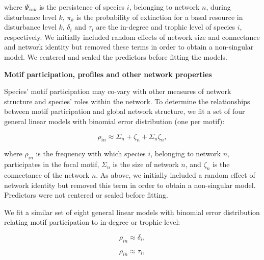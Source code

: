 \documentclass[12pt]{article}
\begin{document}
\begin{spacing}{2.0}
            \noindent where $\Psi_{ink}$ is the persistence of species $i$, belonging to network $n$, during disturbance level $k$, $\pi_k$ is the probability of extinction for a basal resource in disturbance level $k$, 
            $\delta_{i}$ and $\tau_i$ are the in-degree and trophic level of species $i$, respectively.
            We initially included random effects of network size and connectance and network identity but removed these terms in order to obtain a non-singular model.
            We centered and scaled the predictors before fitting the models.


    \textbf{Motif participation, profiles and other network properties}

        Species' motif participation may co-vary with other measures of network structure and species' roles within the network.
        To determine the relationships between motif participation and global network structure, we fit a set of four general linear models with binomial error distribution (one per motif):

        \begin{spacing}{1.0}
        \begin{equation}
            \rho_{in} \approx \Sigma_{n} + \zeta_{n} + \Sigma_{n}\zeta_{n},
            \label{partic_SC}
        \end{equation}
        \end{spacing}
        
        \noindent where $\rho_{in}$ is the frequency with which species $i$, belonging to network $n$, participates in the focal motif, $\Sigma_{n}$ is the size of network $n$, and $\zeta_{n}$ is the connectance of the network $n$.
        As above, we initially included a random effect of network identity but removed this term in order to obtain a non-singular model.
        Predictors were not centered or scaled before fitting.

       
        We fit a similar set of eight general linear models with binomial error distribution relating motif participation to in-degree or trophic level:

        \begin{spacing}{1.0}
        \begin{multicols}{2}
        \begin{equation}
            \rho_{in} \approx \delta_{i},
            \label{partic_deg}
        \end{equation}

        \begin{equation}
            \rho_{in} \approx \tau_{i},
            \label{partic_tl}
        \end{equation}
        \end{multicols}
        \end{spacing}
        

\end{spacing}
\end{document}
